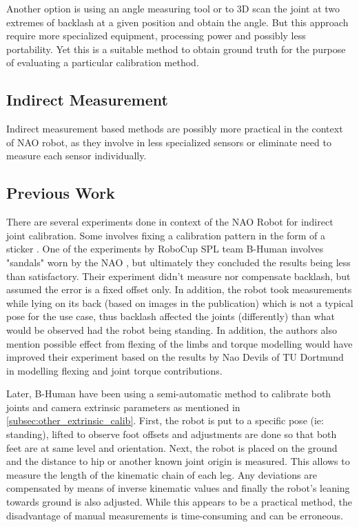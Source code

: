 \documentclass[english, printversion, nomenclature, notitle]{tuvisionthesis} %
\begin{document}
Another option is using an angle measuring tool or to 3D scan the joint at  two extremes of backlash at a given position and obtain the angle. But this approach require more specialized equipment, processing power and possibly less portability. Yet this is a suitable method to obtain ground truth for the purpose of evaluating a particular calibration method.

\subsection{Indirect Measurement}
\label{subsec:indirect_meas}
Indirect measurement based methods are possibly more practical in the context of NAO robot, as they involve in less specialized sensors or eliminate need to measure each sensor individually.

\subsection{Previous Work}
\label{subsec:joint_calib_previous_work}

There are several experiments done in context of the NAO Robot for indirect joint calibration. Some involves fixing a calibration pattern in the form of a sticker \cite{maier_whole-body_2015}. One of the experiments by RoboCup SPL team B-Human involves "sandals" worn by the NAO \cite{kastner_automatic_2015}, but ultimately they concluded the results being less than satisfactory. Their experiment didn't measure nor compensate backlash, but assumed the error is a fixed offset only. In addition, the robot took measurements while lying on its back (based on images in the publication) which is not a typical pose for the use case, thus backlash affected the joints (differently) than what would be observed had the robot being standing. In addition, the authors also mention possible effect from flexing of the limbs and torque modelling would have improved their experiment based on the results by Nao Devils of TU Dortmund in modelling flexing and joint torque contributions.

Later, B-Human have been using a semi-automatic method to calibrate both joints and camera extrinsic parameters as mentioned in \cref{subsec:other_extrinsic_calib}. First, the robot is put to a specific pose (ie: standing), lifted to observe foot offsets and adjustments are done so that both feet are at same level and orientation. Next, the robot is placed on the ground and the distance to hip or another known joint origin is measured. This allows to measure the length of the kinematic chain of each leg. Any deviations are compensated by means of inverse kinematic values and finally the robot's leaning towards ground is also adjusted. While this appears to be a practical method, the disadvantage of manual measurements is time-consuming and can be erroneous. 
\end{document}
